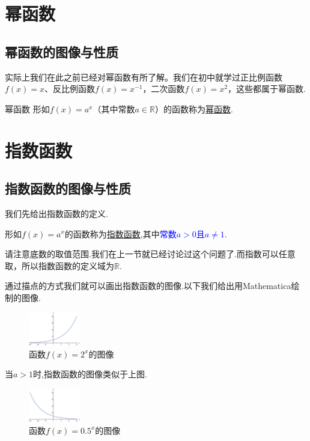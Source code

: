\documentclass[lang=cn,math=cm,chinesefont=nofont,11pt,scheme=chinese,twocol]{elegantbook}
\begin{document}
\section{幂函数}

\subsection{幂函数的图像与性质}

实际上我们在此之前已经对幂函数有所了解。我们在初中就学过正比例函数$f(x)=x$、反比例函数$f(x)=x^{-1}$，二次函数$f(x)=x^2$，这些都属于幂函数.

\begin{definition}{幂函数}
  形如$f(x)=a^x$（其中常数$a\in\mathbb{R}$）的函数称为\underline{幂函数}.
\end{definition}

\section{指数函数}

\subsection{指数函数的图像与性质}

我们先给出指数函数的定义.

\begin{definition}
  形如$f(x)=a^x$的函数称为\underline{指数函数},其中\textcolor{blue}{常数$a>0$且$a\neq 1$}.
\end{definition}

请注意底数的取值范围.我们在上一节就已经讨论过这个问题了.而指数可以任意取，所以指数函数的定义域为$\mathbb{R}$.

通过描点的方式我们就可以画出指数函数的图像.以下我们给出用Mathematica绘制的图像.

\begin{figure}[h]
  \centering
  \includegraphics[width=0.2\textwidth]{image/2.4function1.eps}
  \caption{函数$f(x)=2^x$的图像}
  \label{2.4function1}
\end{figure}

当$a>1$时,指数函数的图像类似于上图.

\begin{figure}[h]
  \centering
  \includegraphics[width=0.2\textwidth]{image/2.4function2.eps}
  \caption{函数$f(x)=0.5^x$的图像}
  \label{2.2.4function2}
\end{figure}
\end{document}
